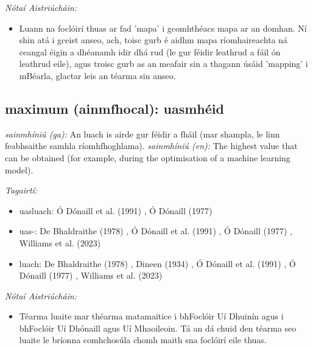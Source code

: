 \documentclass{article}
\begin{document}
 \noindent \textit{Nótaí Aistriúcháin:}
\begin{itemize}
	\item Luann na foclóirí thuas ar fad 'mapa' i gcomhthéacs mapa ar an domhan. Ní shin atá i gceist anseo, ach, toisc gurb é aidhm mapa ríomhaireachta ná ceangal éigin a dhéanamh idir dhá rud (le gur féidir leathrud a fáil ón leathrud eile), agus troisc gurb as an meafair sin a thagann úsáid 'mapping' i mBéarla, glactar leis an téarma sin anseo.
\end{itemize}


\subsection*{maximum (ainmfhocal): uasmhéid} 
 \noindent \textit{sainmhíniú (ga):} An luach is airde gur féidir a fháil (mar shampla, le linn feabhsaithe samhla ríomhfhoghlama).
\newline\newline
 \noindent \textit{sainmhíniú (en):} The highest value that can be obtained (for example, during the optimisation of a machine learning model).
\newline

 \noindent \textit{Tagairtí:}
\begin{itemize}
	\item uasluach: Ó Dónaill et al. (1991) \cite{focloir-beag}, Ó Dónaill (1977) \cite{odonaill}
	\item uas-: De Bhaldraithe (1978) \cite{de-bhaldraithe}, Ó Dónaill et al. (1991) \cite{focloir-beag}, Ó Dónaill (1977) \cite{odonaill}, Williams et al. (2023) \cite{storchiste}
	\item luach: De Bhaldraithe (1978) \cite{de-bhaldraithe}, Dineen (1934) \cite{dineen}, Ó Dónaill et al. (1991) \cite{focloir-beag}, Ó Dónaill (1977) \cite{odonaill}, Williams et al. (2023) \cite{storchiste}
\end{itemize}

 \noindent \textit{Nótaí Aistriúcháin:}
\begin{itemize}
	\item Téarma luaite mar théarma matamaitice i bhFoclóir Uí Dhuinín agus i bhFoclóir Uí Dhónaill agus Uí Mhaoileoin. Tá an dá chuid den téarma seo luaite le bríonna comhchosúla chomh maith sna foclóirí eile thuas.
\end{itemize}
\end{document}
